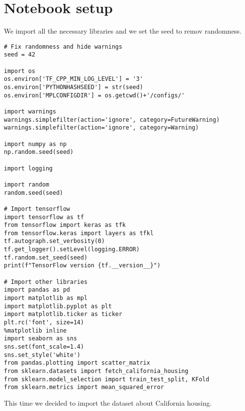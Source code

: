 \section{Notebook setup}

We import all the necessary libraries and we set the seed to remov randomness. 
\begin{lstlisting}[style=Python]
# Fix randomness and hide warnings
seed = 42

import os
os.environ['TF_CPP_MIN_LOG_LEVEL'] = '3'
os.environ['PYTHONHASHSEED'] = str(seed)
os.environ['MPLCONFIGDIR'] = os.getcwd()+'/configs/'

import warnings
warnings.simplefilter(action='ignore', category=FutureWarning)
warnings.simplefilter(action='ignore', category=Warning)

import numpy as np
np.random.seed(seed)

import logging

import random
random.seed(seed)

# Import tensorflow
import tensorflow as tf
from tensorflow import keras as tfk
from tensorflow.keras import layers as tfkl
tf.autograph.set_verbosity(0)
tf.get_logger().setLevel(logging.ERROR)
tf.random.set_seed(seed)
print(f"TensorFlow version {tf.__version__}")

# Import other libraries
import pandas as pd
import matplotlib as mpl
import matplotlib.pyplot as plt
import matplotlib.ticker as ticker
plt.rc('font', size=14)
%matplotlib inline
import seaborn as sns
sns.set(font_scale=1.4)
sns.set_style('white')
from pandas.plotting import scatter_matrix
from sklearn.datasets import fetch_california_housing
from sklearn.model_selection import train_test_split, KFold
from sklearn.metrics import mean_squared_error
\end{lstlisting}
This time we decided to import the dataset about California housing.